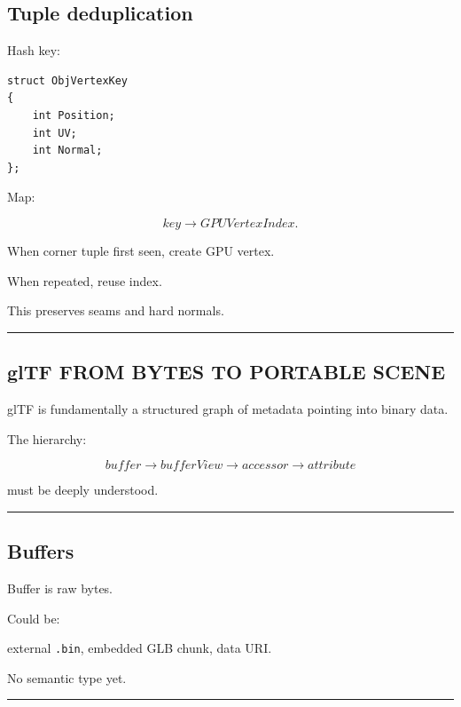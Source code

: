 \subsection{Tuple deduplication}\label{04-visual-computing-ii-ch041-tuple-deduplication}

Hash key:

\begin{verbatim}
struct ObjVertexKey
{
    int Position;
    int UV;
    int Normal;
};
\end{verbatim}

Map:

\[
key\rightarrow GPUVertexIndex.
\]

When corner tuple first seen, create GPU vertex.

When repeated, reuse index.

This preserves seams and hard normals.

\begin{center}\rule{0.5\linewidth}{0.5pt}\end{center}

\subsection{glTF FROM BYTES TO PORTABLE SCENE}\label{04-visual-computing-ii-ch041-gltf-from-bytes-to-portable-scene}

glTF is fundamentally a structured graph of metadata pointing into binary data.

The hierarchy:

\[
\boxed{
buffer
\rightarrow
bufferView
\rightarrow
accessor
\rightarrow
attribute
}
\]

must be deeply understood.

\begin{center}\rule{0.5\linewidth}{0.5pt}\end{center}

\subsection{Buffers}\label{04-visual-computing-ii-ch041-buffers}

Buffer is raw bytes.

Could be:

external \texttt{.bin}, embedded GLB chunk, data URI.

No semantic type yet.

\begin{center}\rule{0.5\linewidth}{0.5pt}\end{center}

